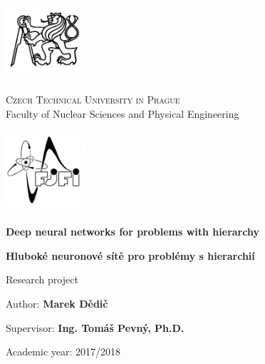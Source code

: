 \begin{center}
	\begin{minipage}{3cm}
		\includegraphics[width=3cm,height=3cm,keepaspectratio]{images/titlepage/cvut}
	\end{minipage}
	\begin{minipage}{0.6\linewidth}
		\begin{center}
			\textsc{\large Czech Technical University in Prague}\\
			{\large Faculty of Nuclear Sciences and Physical Engineering}
		\end{center}
	\end{minipage}
	\begin{minipage}{3cm}
		\includegraphics[width=3cm,height=3cm,keepaspectratio]{images/titlepage/fjfi}
	\end{minipage}

	\vspace{3.3cm}

	\textbf{\huge Deep neural networks for problems with hierarchy}
	\vspace{1.1cm}

	\textenglish{\textbf{\huge Hluboké neuronové sítě pro problémy s hierarchií}}
	\vspace{1.7cm}

	{\large Research project}
\end{center}

\vfill

\begin{list}{}{
	\settowidth{\labelwidth}{MMMMMMMMM}
	\setlength{\leftmargin}{\labelwidth}
	\renewcommand{\makelabel}[1]{#1\hfil}}
	\item [{Author:}] \textbf{Marek Dědič}
	\item [{Supervisor:}] \textbf{Ing. Tomáš Pevný, Ph.D.}
	\item [{Academic year:}] 2017/2018
\end{list}
